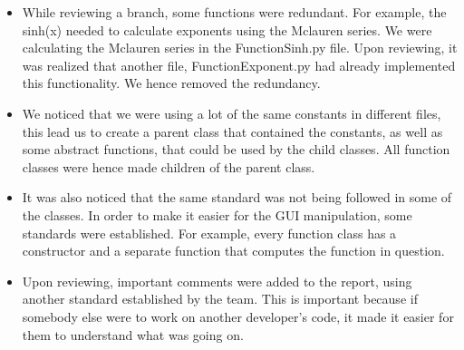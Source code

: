         \begin{itemize}
            \item While reviewing a branch, some functions were redundant. For example, the sinh(x) needed to calculate  exponents  using the Mclauren series. We were calculating the Mclauren series in the FunctionSinh.py file. Upon reviewing, it was realized that another file, FunctionExponent.py had already implemented this functionality. We hence removed the redundancy.

            \item We noticed that we were using a lot of the same constants in different files, this lead us to create a parent class that contained the constants, as well as some abstract functions, that could be used by the child classes. All function classes were hence made children of the parent class.

            \item It was also noticed that the same standard was not being followed in some of the classes. In order to make it easier for the GUI manipulation, some standards were established. For example, every function class has a constructor and a separate function that computes the function in question.

            \item Upon reviewing, important comments were added to the report, using another standard established by the team. This is important because if somebody else were to work on another developer’s code, it made it easier for them to understand what was going on.
        \end{itemize}
